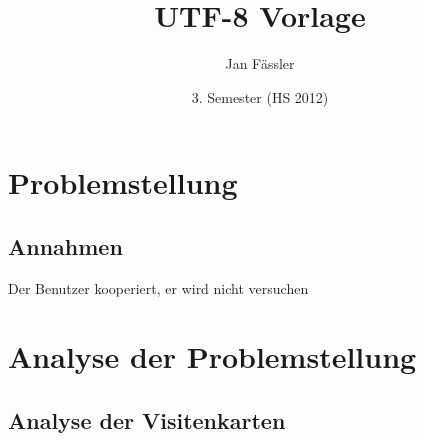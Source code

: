\documentclass[10pt]{article}
\title{
	\vspace{5cm}
	UTF-8 Vorlage
}
\author{Jan Fässler}
\date{3. Semester (HS 2012)}
\begin{document}
\maketitle
\thispagestyle{fancy}

\newpage

\tableofcontents	  	


\newpage
\setcounter{page}{1}


\section{Problemstellung}


\subsection{Annahmen}
Der Benutzer kooperiert, er wird nicht versuchen 

\section{Analyse der Problemstellung}

\subsection{Analyse der Visitenkarten}
\end{document}
